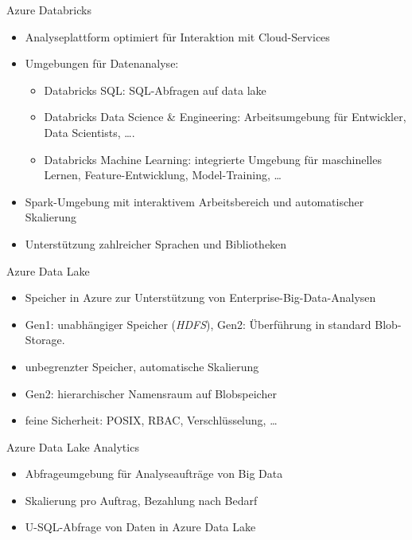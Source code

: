 \begin{flashcard}[Definition]{Azure Databricks}
  \begin{itemize}
    \item Analyseplattform optimiert für Interaktion mit Cloud-Services
    \item Umgebungen für Datenanalyse:
      \begin{itemize}
        \item Databricks SQL: SQL-Abfragen auf data lake
        \item Databricks Data Science \& Engineering: Arbeitsumgebung für Entwickler, Data Scientists, \ldots.
        \item Databricks Machine Learning: integrierte Umgebung für maschinelles Lernen, Feature-Entwicklung, Model-Training, \ldots
      \end{itemize}
      \item Spark-Umgebung mit interaktivem Arbeitsbereich und automatischer Skalierung
      \item Unterstützung zahlreicher Sprachen und Bibliotheken
  \end{itemize}
\end{flashcard}

\begin{flashcard}[Definition]{Azure Data Lake}
  \begin{itemize}
    \item Speicher in Azure zur Unterstützung von Enterprise-Big-Data-Analysen
    \item Gen1: unabhängiger Speicher (\emph{HDFS}), Gen2: Überführung in standard Blob-Storage.
    \item unbegrenzter Speicher, automatische Skalierung
    \item Gen2: hierarchischer Namensraum auf Blobspeicher
    \item feine Sicherheit: POSIX, RBAC, Verschlüsselung, \ldots
  \end{itemize}
\end{flashcard}

\begin{flashcard}[Definition]{Azure Data Lake Analytics}
  \begin{itemize}
    \item Abfrageumgebung für Analyseaufträge von Big Data
    \item Skalierung pro Auftrag, Bezahlung nach Bedarf
    \item U-SQL-Abfrage von Daten in Azure Data Lake
  \end{itemize}
\end{flashcard}

